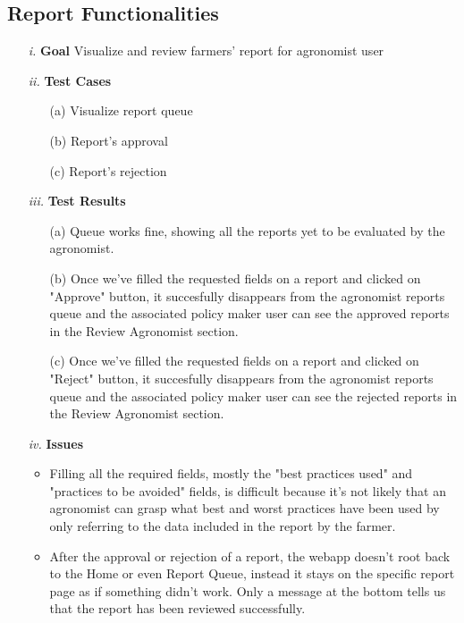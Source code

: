 \documentclass[table, 12pt]{article}
\begin{document}
\subsection{Report Functionalities}
\begin{itemize}
    \item[\textit{i.}] \textbf{Goal} Visualize and review farmers' report for agronomist user
    \item[\textit{ii.}] \textbf{Test Cases}
    \begin{itemize}
        \item[(a)] Visualize report queue
        \item[(b)] Report's approval
        \item[(c)] Report's rejection 
    \end{itemize} 
    \item[\textit{iii.}] \textbf{Test Results}
    \begin{itemize}
        \item[(a)] Queue works fine, showing all the reports yet to be evaluated by the agronomist.
        \item[(b)] Once we've filled the requested fields on a report and clicked on "Approve" button, it succesfully disappears from the agronomist reports queue and the associated policy maker user can see the approved reports in the Review Agronomist section.
        \item[(c)] Once we've filled the requested fields on a report and clicked on "Reject" button, it succesfully disappears from the agronomist reports queue and the associated policy maker user can see the rejected reports in the Review Agronomist section.
    \end{itemize} 
    \item[\textit{iv.}] \textbf{Issues} 
    \begin{itemize}
        \item Filling all the required fields, mostly the "best practices used" and "practices to be avoided" fields, is difficult because it's not likely that an agronomist can grasp what best and worst practices have been used by only referring to the data included in the report by the farmer.
        \item After the approval or rejection of a report, the webapp doesn't root back to the Home or even Report Queue, instead it stays on the specific report page as if something didn't work. Only a message at the bottom tells us that the report has been reviewed successfully. 
    \end{itemize}   
\end{itemize}
\end{document}
